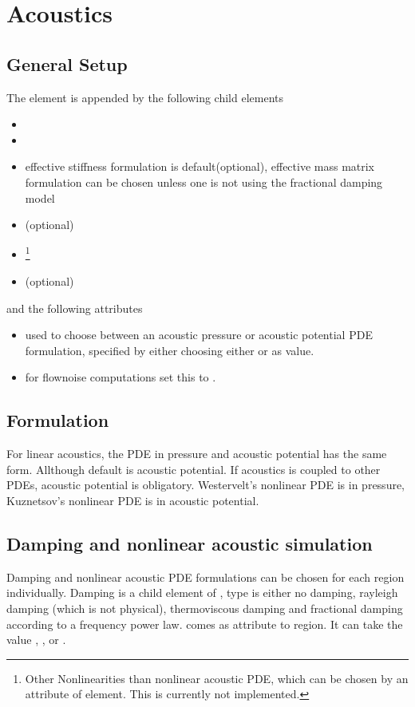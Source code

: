 \newpage
\section{Acoustics}

\subsection{General Setup}
The  element is appended by the following child elements
\begin{itemize}
\item {}
\item {}
\item {} effective stiffness formulation 
is default(optional), effective mass matrix formulation can be chosen unless one is not using the fractional damping model
\item {} (optional)
\item {}\footnote{Other Nonlinearities than nonlinear acoustic
 PDE, which can be chosen by an attribute of  element. This is
 currently not implemented.}
\item {} (optional)
\end{itemize}
and the following attributes
\begin{itemize}
\item {} used to choose between an acoustic pressure or
      acoustic potential PDE formulation, specified by either choosing
      either  or  as value.
\item {} for flownoise computations set this to .
\end{itemize}

\subsection{Formulation}
For linear acoustics, the PDE in pressure and acoustic potential has the same 
form. Allthough default is acoustic potential. If acoustics is coupled to 
other PDEs, acoustic potential is obligatory. Westervelt's nonlinear PDE is 
in pressure, Kuznetsov's nonlinear PDE is in acoustic potential.

\subsection{Damping and nonlinear acoustic simulation}
Damping and nonlinear acoustic PDE formulations can be chosen for each 
region individually. Damping is a child element of ,
type is either no damping, rayleigh damping (which is not physical), 
thermoviscous damping and fractional damping according to a 
frequency power law.
 comes as attribute to region. It can take the value ,
, or .

